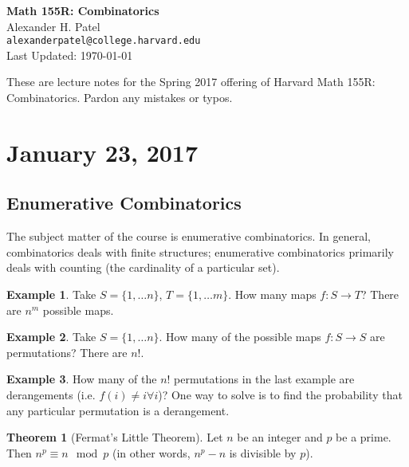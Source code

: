 \documentclass[12pt]{article}
\theoremstyle{definition}
\newtheorem{theorem}{Theorem}
\newtheorem{exmp}{Example}[section]
\begin{document}
\begin{center}
\textbf{Math 155R: Combinatorics} \\
Alexander H. Patel \\
{\tt alexanderpatel@college.harvard.edu} \\
Last Updated: \today
\end{center}

These are lecture notes for the Spring 2017 offering of Harvard Math 155R:
Combinatorics. Pardon any mistakes or typos.

\tableofcontents

\section{January 23, 2017}

\subsection{Enumerative Combinatorics}

The subject matter of the course is enumerative combinatorics. In general,
combinatorics deals with finite structures; enumerative combinatorics primarily
deals with counting (the cardinality of a particular set).

\begin{exmp}
    Take $S = \{1, \ldots n\}$, $T = \{1, \ldots m\}$. How many maps $f: S
    \rightarrow T$? There are $n^m$ possible maps.
\end{exmp}

\begin{exmp}
    Take $S = \{1, \ldots n\}$. How many of the possible maps $f: S
    \rightarrow S$ are permutations? There are $n!$.
\end{exmp}

\begin{exmp}
    How many of the $n!$ permutations in the last example are
    derangements (i.e. $f(i) \ne i \forall i$)? One way to solve is to
    find the probability that any particular permutation is a
    derangement. 
\end{exmp}

\begin{theorem}[Fermat's Little Theorem]
    Let $n$ be an integer and $p$ be a prime. Then $n^p \equiv n \mod
    p$ (in other words, $n^p - n$ is divisible by $p$).
\end{theorem}
\end{document}

